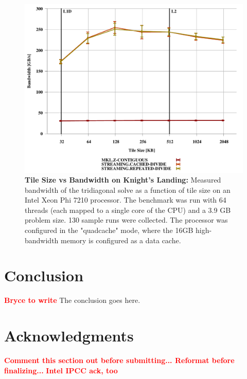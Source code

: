 \documentclass[conference]{IEEEtran}
\newcommand{\fix}[1]{{\bf \textcolor {red}{#1}}}
\begin{document}
\begin{figure}%
\centering
\includegraphics[width=0.9\columnwidth]{figures/post_tsb_tw_sweep_full_matrix_double_precision_production_knl_7210_08_21_2016_64pus.pdf}
\caption{\textbf{Tile Size vs Bandwidth on Knight's Landing:}
Measured bandwidth of the tridiagonal solve as a function of tile size on
an Intel Xeon Phi 7210 processor. The benchmark was run with 64 threads (each
mapped to a single core of the CPU) and a 3.9 GB problem size. 130 sample runs
were collected. The processor was configured in the "quadcache" mode, where the
16GB high-bandwidth memory is configured as a data cache.}
\end{figure}

\section{Conclusion}
\fix{Bryce to write}
The conclusion goes here.


\section*{Acknowledgments}
\fix{Comment this section out before submitting... Reformat before finalizing...}
\fix{Intel IPCC ack, too}
\end{document}
